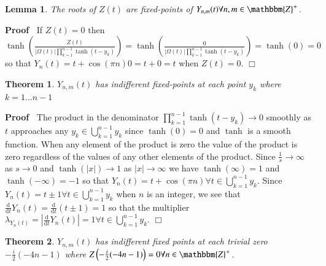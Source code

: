 \documentclass{elsarticle}
\newcommand{\mathd}{\mathrm{d}}
\newenvironment{proof}{\noindent\textbf{Proof\ }}{\hspace*{\fill}$\Box$\medskip}
\newtheorem{lemma}{Lemma}
{\theorembodyfont{\rmfamily}\newtheorem{note}{Note}}
\newtheorem{theorem}{Theorem}
\begin{document}
\begin{lemma}
  The roots of $Z (t)$ are fixed-points of $Y_{n, m} (t) \forall n, m \in
  \mathbbm{Z}^+$.
\end{lemma}

\begin{proof}
  If $Z (t) = 0$ then $\tanh \left( \frac{Z (t)}{| \Omega (t) | \prod_{k =
  1}^{n - 1} \tanh (t - y_k)} \right) = \tanh \left( \frac{0}{| \Omega (t) |
  \prod_{k = 1}^{n - 1} \tanh (t - y_k)} \right) = \tanh (0) = 0$ so that $Y_n
  (t) = t + \cos (\pi n) 0 = t + 0 = t$ when $Z (t) = 0$.
\end{proof}

\begin{theorem}
  $Y_{n, m} (t)$ has indifferent fixed-points at each point $y_k$ where $k = 1
  \ldots n - 1$
\end{theorem}

\begin{proof}
  The product in the denominator $\prod_{k = 1}^{n - 1} \tanh (t - y_k)
  \rightarrow 0$ smoothly as $t$ approaches any $y_k \in \bigcup_{k = 1}^{n -
  1} y_k$ since $\tanh (0) = 0$ and $\tanh$ is a smooth function. When any
  element of the product is zero the value of the product is zero regardless
  of the values of any other elements of the product. Since $\frac{1}{s}
  \rightarrow \infty$ as $s \rightarrow 0$ and $\tanh (| x |) \rightarrow 1$
  as $| x | \rightarrow \infty$ we have $\tanh (\infty) = 1$ and $\tanh (-
  \infty) = - 1$ so that $Y_n (t) = t + \cos (\pi n) \forall t \in \bigcup_{k
  = 1}^{n - 1} y_k$. Since $Y_n (t) = t \pm 1 \forall t \in \bigcup_{k = 1}^{n
  - 1} y_k$ when $n$ is an integer, we see that $\frac{\mathd}{\mathd t} Y_n
  (t) = \frac{\mathd}{\mathd t} (t \pm 1) = 1$ so that the multiplier
  $\lambda_{Y_n (t)} = \left| \frac{\mathd}{\mathd t} Y_n (t) \right| = 1
  \forall t \in \bigcup_{k = 1}^{n - 1} y_k$.
\end{proof}

\begin{theorem}
  $Y_{n, m} (t)$ has indifferent fixed points at each trivial zero $-
  \frac{i}{2} (- 4 n - 1)$ where $Z \left( - \frac{i}{2} (- 4 n - 1) \right) =
  0 \forall n \in \mathbbm{Z}^{+_{}}$.
\end{theorem}
\end{document}
